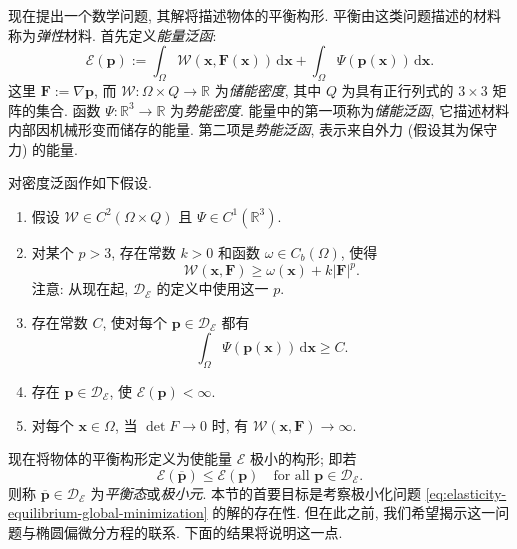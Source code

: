 现在提出一个数学问题, 其解将描述物体的平衡构形. 平衡由这类问题描述的材料称为\emph{弹性}材料. 首先定义\emph{能量泛函}:
\begin{equation}\label{eq:elasticity-total-energy-functional}
\mathcal{E}(\bm{p}):=\int_\Omega\mathcal{W}(\bm{x},\bm{F}(\bm{x}))\,\mathrm{d}\bm{x}+\int_\Omega\Psi(\bm{p}(\bm{x}))\,\mathrm{d}\bm{x}.
\end{equation}
这里 $\bm{F}:=\nabla\bm{p}$, 而 $\mathcal{W}:\Omega\times Q\to\mathbb{R}$ 为\emph{储能密度}, 其中 $Q$ 为具有正行列式的 $3\times3$ 矩阵的集合. 函数 $\Psi:\mathbb{R}^3\to\mathbb{R}$ 为\emph{势能密度}. 能量中的第一项称为\emph{储能泛函}, 它描述材料内部因机械形变而储存的能量. 第二项是\emph{势能泛函}, 表示来自外力 (假设其为保守力) 的能量.

对密度泛函作如下假设.\begin{enumerate}\item 假设 $\mathcal{W}\in C^2(\Omega\times Q)$ 且 $\Psi\in C^1(\mathbb{R}^3)$.\item 对某个 $p>3$, 存在常数 $k>0$ 和函数 $\omega\in C_b(\Omega)$, 使得
\begin{equation}\label{eq:elasticity-stored-energy-p-growth-bound}
\mathcal{W}(\bm{x},\bm{F})\geq\omega(\bm{x})+k|\bm{F}|^p.
\end{equation}
注意: 从现在起, $\mathcal{D}_{\mathcal{E}}$ 的定义中使用这一 $p$.\item 存在常数 $C$, 使对每个 $\bm{p}\in\mathcal{D}_{\mathcal{E}}$ 都有
\begin{equation}\label{eq:elasticity-potential-energy-uniform-lower-bound}
\int_\Omega\Psi(\bm{p}(\bm{x}))\,\mathrm{d}\bm{x}\geq C.
\end{equation}
\item 存在 $\bm{p}\in\mathcal{D}_{\mathcal{E}}$, 使 $\mathcal{E}(\bm{p})<\infty$.\item 对每个 $\bm{x}\in\Omega$, 当 $\det F\to0$ 时, 有 $\mathcal{W}(\bm{x},\bm{F})\to\infty$.\end{enumerate}

现在将物体的平衡构形定义为使能量 $\mathcal{E}$ 极小的构形; 即若
\begin{equation}\label{eq:elasticity-equilibrium-global-minimization}
\mathcal{E}(\overline{\bm{p}})\leq\mathcal{E}(\bm{p})\quad\text{for all }\bm{p}\in\mathcal{D}_{\mathcal{E}}.
\end{equation}
则称 $\overline{\bm{p}}\in\mathcal{D}_{\mathcal{E}}$ 为\emph{平衡态}或\emph{极小元}. 本节的首要目标是考察极小化问题 \eqref{eq:elasticity-equilibrium-global-minimization} 的解的存在性. 但在此之前, 我们希望揭示这一问题与椭圆偏微分方程的联系. 下面的结果将说明这一点.
